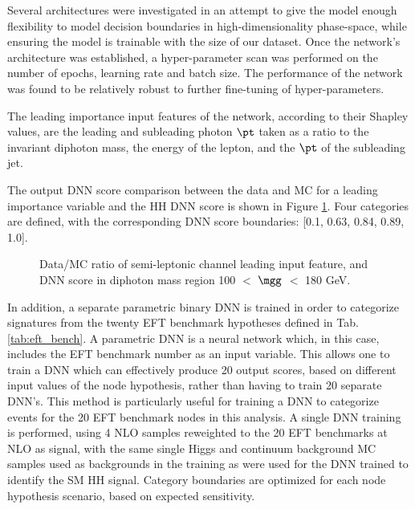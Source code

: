 Several architectures were investigated in an attempt to give the model enough flexibility to model decision boundaries in high-dimensionality
phase-space, while ensuring the model is trainable with the size of our dataset. Once the network's architecture was established, a hyper-parameter scan was performed on the number of epochs, 
learning rate and batch size. The performance of the network was found to be relatively robust to further fine-tuning of hyper-parameters.

The leading importance input features of the network, according to their Shapley values, are the leading and subleading photon $\pt$ taken as a ratio to the invariant diphoton mass, 
the energy of the lepton, and the $\pt$ of the subleading jet. 

The output DNN score comparison between the data and MC for a leading importance variable and the HH DNN score is shown in Figure \ref{fig:SLDNNFeaturecontrolplots-1}. Four categories are defined, with the corresponding DNN score boundaries: 
[0.1, 0.63, 0.84, 0.89, 1.0].


\begin{figure}[!htbp]
  \setcounter{subfigure}{0}
  \centering
  \qquad
  \caption{Data/MC ratio of semi-leptonic channel leading input feature, and DNN score in diphoton mass region 100 $<$ $\mgg$ $<$ 180 GeV.}
  \label{fig:SLDNNFeaturecontrolplots-1}
\end{figure}

In addition, a separate parametric binary DNN is trained in order to categorize signatures from the twenty EFT benchmark hypotheses defined in Tab. \ref{tab:eft_bench}. A parametric DNN is a
neural network which, in this case, includes the EFT benchmark number as an input variable. This allows one to train a DNN which can effectively produce 20 output scores, based on different 
input values of the node hypothesis, rather than having to train 
20 separate DNN's. This method is particularly useful for training a DNN to categorize events for the 20 EFT benchmark nodes in this analysis. A single DNN training is performed, using 
4 NLO samples reweighted to the 20 EFT benchmarks at NLO as signal, with the same single Higgs and continuum background MC samples used as backgrounds in the training as were used for the DNN 
trained to identify the SM HH signal. Category boundaries are optimized for each node hypothesis scenario, based on expected sensitivity. 
